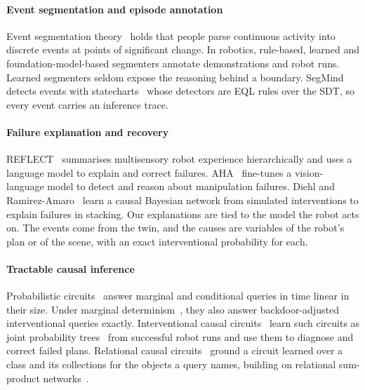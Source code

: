 \documentclass[letterpaper, 10 pt, conference]{ieeeconf}
\newcommand{\segmind}{SegMind}
\newcommand{\eql}{EQL}
\newcommand{\sdt}{SDT}
\begin{document}
\paragraph*{Event segmentation and episode annotation}
Event segmentation theory~\cite{zacks2007event,kurby2008segmentation} holds that
people parse continuous activity into discrete events at points of significant
change. In robotics, rule-based, learned and foundation-model-based segmenters
annotate demonstrations and robot runs. Learned segmenters seldom expose the
reasoning behind a boundary. \segmind{}~\cite{arion2026segmind} detects events
with statecharts~\cite{stelter2025motionstatecharts} whose detectors are \eql{}
rules over the \sdt{}, so every event carries an inference trace.

\paragraph*{Failure explanation and recovery}
REFLECT~\cite{liu2023reflect} summarises multisensory robot experience
hierarchically and uses a language model to explain and correct failures.
AHA~\cite{duan2024aha} fine-tunes a vision-language model to detect and reason
about manipulation failures. Diehl and Ramirez-Amaro~\cite{diehl2022why} learn a
causal Bayesian network from simulated interventions to explain failures in
stacking. Our explanations are tied to the model the robot acts on. The events
come from the twin, and the causes are variables of the robot's plan or of the
scene, with an exact interventional probability for each.

\paragraph*{Tractable causal inference}
Probabilistic circuits~\cite{choi2020probabilistic} answer marginal and
conditional queries in time linear in their size. Under marginal
determinism~\cite{wang2023compositional}, they also answer backdoor-adjusted
interventional queries exactly. Interventional causal
circuits~\cite{vasantakumaar2026icc} learn such circuits as joint probability
trees~\cite{nyga2023jpt} from successful robot runs and use them to diagnose and
correct failed plans. Relational causal circuits~\cite{anon2027relational}
ground a circuit learned over a class and its collections for the objects a
query names, building on relational sum-product
networks~\cite{nath2015relational}.

\end{document}
